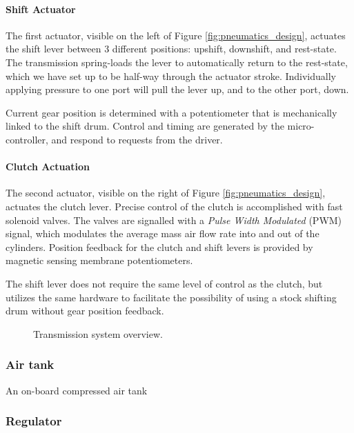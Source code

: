 \paragraph{Shift Actuator}

The first actuator, visible on the left of Figure \ref{fig:pneumatics_design}, actuates the shift lever between 3 different positions: upshift, downshift, and rest-state. The transmission spring-loads the lever to automatically return to the rest-state, which we have set up to be half-way through the actuator stroke. Individually applying pressure to one port will pull the lever up, and to the other port, down.

Current gear position is determined with a potentiometer that is mechanically linked to the shift drum. Control and timing are generated by the micro-controller, and respond to requests from the driver.

\paragraph{Clutch Actuation}

The second actuator, visible on the right of Figure \ref{fig:pneumatics_design}, actuates the clutch lever. Precise control of the clutch is accomplished with fast solenoid valves. The valves are signalled with a \emph{Pulse Width Modulated} (PWM) signal, which modulates the average mass air flow rate into and out of the cylinders. Position feedback for the clutch and shift levers is provided by magnetic sensing membrane potentiometers. 


The shift lever does not require the same level of control as the clutch, but utilizes the same hardware to facilitate the possibility of using a stock shifting drum without gear position feedback.

\begin{figure}[H]
	\centering
%		
	\caption{Transmission system overview.}
	\label{fig:transmission_system_overview}
\end{figure}

\subsubsection{Air tank}

An on-board compressed air tank 

\subsubsection{Regulator}

